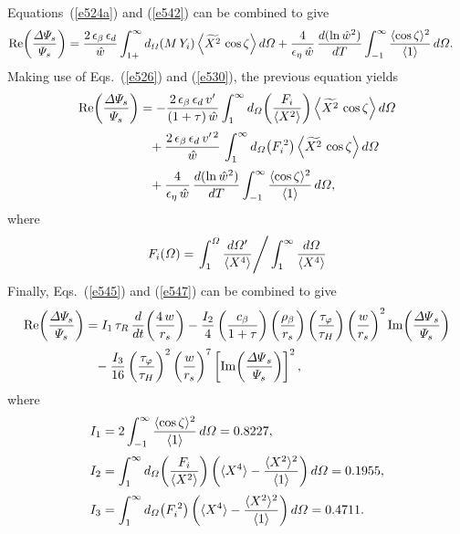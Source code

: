 \documentclass[12pt,prb,aps]{revtex4-1}
\begin{document}
Equations~(\ref{e524a}) and (\ref{e542}) can be combined to give
\begin{align}
{\rm Re}\!\left(\frac{{\mit\Delta}{\mit\Psi}_s}{{\mit\Psi}_s}\right)&= \frac{2\,\epsilon_\beta\,\epsilon_d}{\hat{w}}
\int_{1+}^\infty d_{\mit\Omega}(M\,Y_i)\left\langle\widetilde{X^2}\,\cos\zeta\right\rangle d{\mit\Omega}
+\frac{4}{\epsilon_\eta\,\hat{w}}\,\frac{d(\ln \hat{w}^2)}{dT}\int_{-1}^\infty \frac{\langle \cos\zeta\rangle^2}{\langle 1\rangle}\,d{\mit\Omega}. 
\end{align}
Making use of Eqs.~(\ref{e526}) and (\ref{e530}), the previous equation yields
\begin{align}
{\rm Re}\!\left(\frac{{\mit\Delta}{\mit\Psi}_s}{{\mit\Psi}_s}\right)&= -\frac{2\,\epsilon_\beta\,\epsilon_d\,v'}{(1+\tau)\,\hat{w}}
\int_1^\infty d_{\mit\Omega}\!\left(\frac{F_i}{\langle X^2\rangle}\right)\left\langle\widetilde{X^2}\,\cos\zeta\right\rangle d{\mit\Omega}
\nonumber\\[0.5ex]
&\phantom{=}+ \frac{2\,\epsilon_\beta\,\epsilon_d\,v'^{\,2}}{\hat{w}} \,\int_1^\infty d_{\mit\Omega}\!\left(F_i^{\,2}\right)\left\langle\widetilde{X^2}\,\cos\zeta\right\rangle d{\mit\Omega}\nonumber\\[0.5ex]
&\phantom{=}+\frac{4}{\epsilon_\eta\,\hat{w}}\,\frac{d(\ln \hat{w}^2)}{dT}\int_{-1}^\infty \frac{\langle \cos\zeta\rangle^2}{\langle 1\rangle}\,d{\mit\Omega},\label{e547}
\end{align}
where
\begin{equation}
F_i({\mit\Omega})=\left.\int_1^{\mit\Omega}\frac{d{\mit\Omega}'}{\langle X^4\rangle}\right/\int_1^\infty\frac{d{\mit\Omega}}{\langle X^4\rangle}
\end{equation}
Finally, Eqs.~(\ref{e545}) and (\ref{e547})
can be combined to give\,\cite{fw,fw1}
\begin{align}\label{e559}
{\rm Re}\!\left(\frac{{\mit\Delta}{\mit\Psi}_s}{{\mit\Psi}_s}\right)&= I_1\,\tau_R\,\frac{d}{dt}\!\left(\frac{4\,w}{r_s}\right)
- \frac{I_2}{4}\left(\frac{c_\beta}{1+\tau}\right)\left(\frac{\rho_\beta}{r_s}\right)\left(\frac{\tau_\varphi}{\tau_H}\right)\left(\frac{w}{r_s}\right)^2 {\rm Im}\!\left(\frac{{\mit\Delta\Psi}_s}{{\mit\Psi}_s}\right)\nonumber\\[0.5ex]
&\phantom{=} -\frac{I_3}{16}\left(\frac{\tau_\varphi}{\tau_H}\right)^2 \left(\frac{w}{r_s}\right)^7\left[{\rm Im}\!\left(\frac{{\mit\Delta\Psi}_s}{{\mit\Psi}_s}\right)\right]^2, 
\end{align}
where
\begin{align}
I_1 &= 2\int_{-1}^\infty \frac{\langle \cos\zeta\rangle^2}{\langle 1\rangle}\,d{\mit\Omega} =0.8227,\\[0.5ex]
I_2&= \int_1^\infty d_{\mit\Omega}\!\left(\frac{F_i}{\langle X^2\rangle}\right)\left(\langle X^4\rangle - \frac{\langle X^2\rangle^2}{\langle 1\rangle}\right)d{\mit\Omega} =0.1955,\\[0.5ex]
I_3&= \int_1^\infty d_{\mit\Omega}\!\left(F_i^{\,2}\right)\left(\langle X^4\rangle - \frac{\langle X^2\rangle^2}{\langle 1\rangle}\right)d{\mit\Omega} =0.4711.
\end{align}
\end{document}
